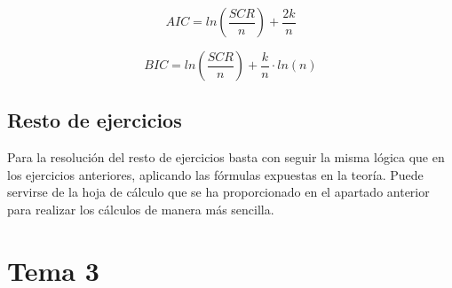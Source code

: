 \documentclass[a4paper,12pt]{article}
\begin{document}
\begin{equation}
    AIC = ln (\frac{SCR}{n}) + \frac{2k}{n}
\end{equation}

\begin{equation}
    BIC = ln (\frac{SCR}{n}) + \frac{k}{n} \cdot ln(n)
\end{equation}

\subsection{Resto de ejercicios}
Para la resolución del resto de ejercicios basta con seguir la misma lógica que en los ejercicios anteriores, aplicando las fórmulas expuestas en la teoría. Puede servirse de la hoja de cálculo que se ha proporcionado en el apartado anterior para realizar los cálculos de manera más sencilla.


\section{Tema 3}
\end{document}
